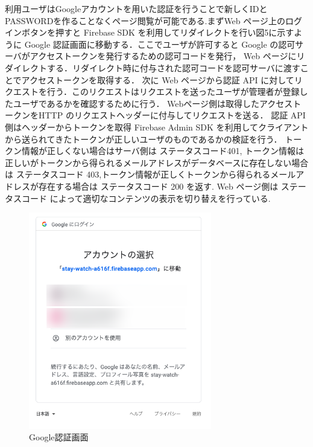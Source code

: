 \documentclass[a4j,8pt,twocolumn]{extarticle}
\begin{document}
利用ユーザはGoogleアカウントを用いた認証を行うことで新しくIDとPASSWORDを作ることなくページ閲覧が可能である.まずWeb ページ上のログインボタンを押すと Firebase SDK を利用してリダイレクトを行い図5に示すように Google 認証画面に移動する．ここでユーザが許可すると Google の認可サーバがアクセストークンを発行するための認可コードを発行， Web ページにリダイレクトする．リダイレクト時に付与された認可コードを認可サーバに渡すことでアクセストークンを取得する．
次に Web ページから認証 API に対してリクエストを行う．このリクエストはリクエストを送ったユーザが管理者が登録したユーザであるかを確認するために行う．
Webページ側は取得したアクセストークンをHTTP のリクエストヘッダーに付与してリクエストを送る．
認証 API 側はヘッダーからトークンを取得 Firebase Admin SDK を利用してクライアントから送られてきたトークンが正しいユーザのものであるかの検証を行う．
トークン情報が正しくない場合はサーバ側は ステータスコード401,
トークン情報は正しいがトークンから得られるメールアドレスがデータベースに存在しない場合は ステータスコード 403,トークン情報が正しくトークンから得られるメールアドレスが存在する場合は ステータスコード 200 を返す.
Web ページ側は ステータスコード によって適切なコンテンツの表示を切り替えを行っている.

\begin{figure}[tbh]
    \centering
    \includegraphics[width=8cm]{googleLogin.jpg}
    \caption{Google認証画面}
    \label{multipleBPM}
\end{figure}
\end{document}
